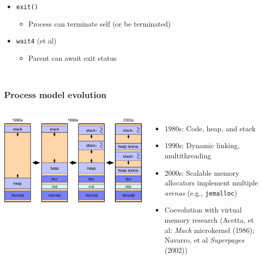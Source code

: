 \begin{frame}
\begin{columns}[T]
\begin{itemize}
      \pause

      \item \texttt{exit()}
      \begin{itemize}
	\item Process can terminate self (or be terminated)
      \end{itemize}

      \pause

      \item \texttt{wait4} (et al)
      \begin{itemize}
	\item Parent can await exit status
      \end{itemize}
    \end{itemize}
  \end{columns}
\end{frame}

\begin{frame}
  \frametitle{Process model evolution}

  \begin{columns}[T]
      \vspace{1cm}
      \includegraphics[width=1.1\textwidth]{../../figures/process-programmer-model.pdf}

      \begin{itemize}

	\pause

        \item 1980s: Code, heap, and stack

	\pause

        \item 1990s: Dynamic linking, multithreading

	\pause

        \item 2000s: Scalable memory allocators implement multiple
	  \textit{arenas}  (e.g., \texttt{jemalloc})

	\pause

        \item Coevolution with virtual memory research (Acetta, et al:
	  \textit{Mach} microkernel (1986); Navarro, et al \textit{Superpages}
	  (2002))
      \end{itemize}
  \end{columns}
\end{frame}

